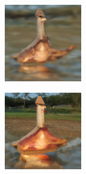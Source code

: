 \documentclass{article}
\begin{document}
\begin{figure}
\begin{subfigure}[b]{0.5\linewidth}
\begin{subfigure}[b]{0.242\linewidth}
        \end{subfigure}
        \hfill
    \end{subfigure}%
    \begin{subfigure}[b]{0.5\linewidth}
        \begin{subfigure}[b]{0.242\linewidth}
        \includegraphics[width=\linewidth]{figures/imagenet128/solver_samples/imagenet128_fm_ot_203_05.png}
        \end{subfigure}
        \begin{subfigure}[b]{0.242\linewidth}
        \includegraphics[width=\linewidth]{figures/imagenet128/solver_samples/imagenet128_fm_ot_203_10.png}

\end{subfigure}
\end{subfigure}
\end{figure}
\end{document}

